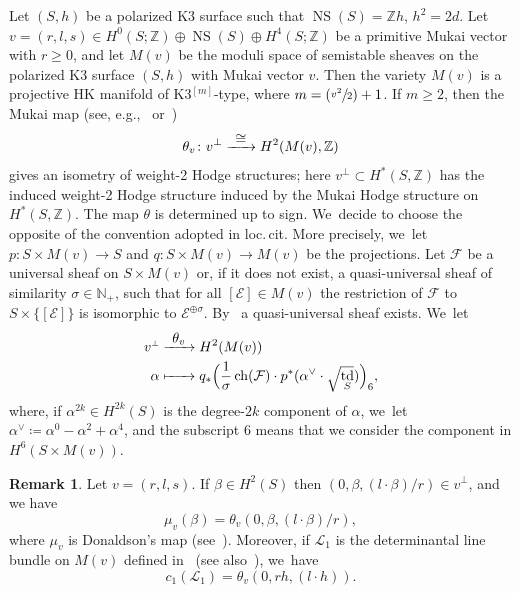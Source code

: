 \documentclass[JEP,XML,SOM,Unicode,published]{cedram}
\newcommand\To[1]{\mathchoice{\xrightarrow{\textstyle\kern4pt#1\kern3pt}}{\stackrel{#1}{\longrightarrow}}{}{}}
\newcommand\Mto[1]{\mathrel{\mapstochar\To{#1}}}
\newcommand{\Psfrac}[2]{(\sfrac{#1}{#2})}
\newcommand{\HK}{\textup{HK}\xspace}
\let\oldbot\bot
\renewcommand{\bot}{{\scriptscriptstyle\oldbot}}
\newcommand{\NN}{{\mathbb N}}
\newcommand{\ZZ}{{\mathbb Z}}\let\Z\ZZ
\newcommand\cE{\mathcal{E}}
\newcommand\cF{\mathcal{F}}
\newcommand\cL{\mathcal{L}}
\DeclareMathOperator{\ch}{ch}
\DeclareMathOperator{\NS}{NS}
\DeclareMathOperator{\td}{td}
\theoremstyle{definition}
\newtheorem{rema}[lemm]{Remark}
\begin{document}
Let $(S,h)$ be a polarized K3 surface such that $\NS(S)=\ZZ h$, $h^2=2d$. Let $v=(r,l,s)\in H^0(S;\ZZ)\oplus\NS(S)\oplus H^4(S;\ZZ)$ be a primitive Mukai vector with $r\ge 0$, and let $M(v)$ be the moduli space of semistable sheaves on the polarized K3 surface $(S,h)$ with Mukai vector $v$.
Then the variety $M(v)$ is a projective \HK manifold of K3$^{[m]}$-type, where $m=\Psfrac{v^2}{2}+1$.
If $m\geq2$, then the Mukai map (see, e.g.,~\cite[Main\,Th.\,]{Kieran:weight2} or~\cite[Eq.\,(1.6)]{Yos:moduli})
\[
\theta_v\colon v^\perp \To{\cong} H^2(M(v),\ZZ)
\]
gives an isometry of weight-2 Hodge structures; here $v^\perp\subset H^*(S,\ZZ)$ has the induced weight-2 Hodge structure induced by the Mukai Hodge structure on $H^*(S,\ZZ)$. The map $\theta$ is determined up to sign. We~decide to choose the opposite of the convention adopted in loc.\,cit.
More precisely, we~let $p\colon S\times M(v)\to S$ and $q\colon S\times M(v)\to M(v)$ be the projections. Let $\cF$ be a universal sheaf on $S\times M(v)$ or, if it does not exist, a quasi-universal sheaf of similarity $\sigma\in\NN_{+}$, \ie such that for all $[\cE]\in M(v)$ the restriction of $\cF$ to $S\times\{[\cE]\}$ is isomorphic to $\cE^{\oplus\sigma}$. By~\cite[Th.\,A.5]{Mukai:Tata}
a quasi-universal sheaf exists. We~let
\begin{equation}\label{mappatheta}
\begin{aligned}
v^{\bot} & \To{\theta_v} H^2(M(v)) \\
\alpha & \Mto{\hphantom{\theta_v}} q_{*}\Bigl(\frac{1}{\sigma}\ch(\cF)\cdot p^{*}(\alpha^{\vee}\cdot\sqrt{\td_S})\Bigr)_6,
\end{aligned}
\end{equation}
where, if $\alpha^{2k}\in H^{2k}(S)$ is the degree-$2k$ component of $\alpha$, we~let
$\alpha^{\vee}\coloneqq \alpha^0-\alpha^2+\alpha^4$, and the subscript $6$ means that we consider the component in $H^6(S\times M(v))$.

\begin{rema}\label{rema:dondivisors}
Let $v=(r,l,s)$.
If $\beta\in H^2(S)$ then
$(0,\beta,(l\cdot \beta)/r)\in v^{\bot}$, and we have
\begin{equation*}
\mu_v(\beta)=\theta_v(0,\beta,(l\cdot \beta)/r),
\end{equation*}
where $\mu_v$ is Donaldson's map (see~\cite[\S 3]{Kieran:weight2}). Moreover, if $\cL_1$ is the determinantal line bundle on $M(v)$ defined in~\cite{LePotier:DetLineBundle} (see also~\cite[\S 8.1]{HL:moduli}), we~have
\begin{equation*}
c_1(\cL_1)=\theta_v(0,rh,(l\cdot h)).
\end{equation*}
\end{rema}
\end{document}
